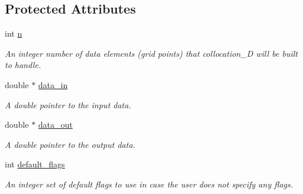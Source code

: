 \subsection*{Protected Attributes}
\begin{DoxyCompactItemize}
\item 
\hypertarget{classbases_1_1explicit__plan_a6acccce0b2ef4489b411a264cab019c9}{int \hyperlink{classbases_1_1explicit__plan_a6acccce0b2ef4489b411a264cab019c9}{n}}\label{classbases_1_1explicit__plan_a6acccce0b2ef4489b411a264cab019c9}

\begin{DoxyCompactList}\small\item\em An integer number of data elements (grid points) that collocation\-\_\-D will be built to handle. \end{DoxyCompactList}\item 
\hypertarget{classbases_1_1explicit__plan_a8faf976ec6c01951dd6d5e7421630184}{double $\ast$ \hyperlink{classbases_1_1explicit__plan_a8faf976ec6c01951dd6d5e7421630184}{data\-\_\-in}}\label{classbases_1_1explicit__plan_a8faf976ec6c01951dd6d5e7421630184}

\begin{DoxyCompactList}\small\item\em A double pointer to the input data. \end{DoxyCompactList}\item 
\hypertarget{classbases_1_1explicit__plan_a55946d0b4b1a19da12469447de247b82}{double $\ast$ \hyperlink{classbases_1_1explicit__plan_a55946d0b4b1a19da12469447de247b82}{data\-\_\-out}}\label{classbases_1_1explicit__plan_a55946d0b4b1a19da12469447de247b82}

\begin{DoxyCompactList}\small\item\em A double pointer to the output data. \end{DoxyCompactList}\item 
\hypertarget{classbases_1_1plan_a756595e230cc99e84de4392ac691eefd}{int \hyperlink{classbases_1_1plan_a756595e230cc99e84de4392ac691eefd}{default\-\_\-flags}}\label{classbases_1_1plan_a756595e230cc99e84de4392ac691eefd}

\begin{DoxyCompactList}\small\item\em An integer set of default flags to use in case the user does not specify any flags. \end{DoxyCompactList}\end{DoxyCompactItemize}


